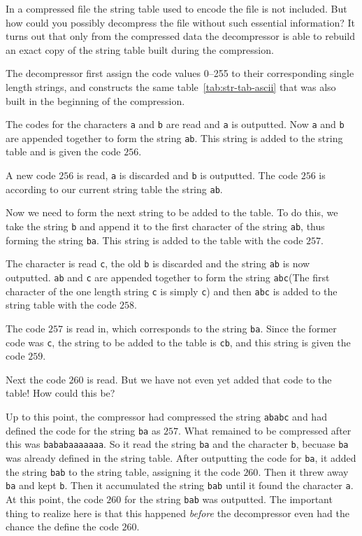 In a \lzw compressed file the string table used to encode the file is
not included. But how could you possibly decompress the file without
such essential information? It turns out that only from the compressed
data the decompressor is able to rebuild an exact copy of the string
table built during the compression.

The decompressor first assign the code values 0--255 to their
corresponding single length strings, and constructs the same
table~\ref{tab:str-tab-ascii} that was also built in the beginning of
the compression.

The codes for the characters \texttt{a} and \texttt{b} are read and
\texttt{a} is outputted. Now \texttt{a} and \texttt{b} are appended
together to form the string \texttt{ab}. This string is added to the
string table and is given the code $256$.

A new code $256$ is read, \texttt{a} is discarded and \texttt{b} is
outputted. The code $256$ is according to our current string table the
string \texttt{ab}.

Now we need to form the next string to be added to the table. To do
this, we take the string \texttt{b} and append it to the first
character of the string \texttt{ab}, thus forming the string
\texttt{ba}. This string is added to the table with the code $257$.

The character is read \texttt{c}, the old \texttt{b} is discarded and the string
\texttt{ab} is now outputted. \texttt{ab} and \texttt{c} are appended together
to form the string \texttt{abc}(The first character of the one length
string \texttt{c} is simply \texttt{c}) and then \texttt{abc} is added to the string
table with the code $258$.

The code $257$ is read in, which corresponds to the string
\texttt{ba}. Since the former code was \texttt{c}, the string to be
added to the table is \texttt{cb}, and this string is given the code
$259$.

Next the code $260$ is read. But we have not even yet added that code
to the table! How could this be?

Up to this point, the compressor had compressed the string
\texttt{ababc} and had defined the code for the string \texttt{ba} as
$257$. What remained to be compressed after this was
\texttt{bababaaaaaaa}. So it read the string \texttt{ba} and the
character \texttt{b}, becuase \texttt{ba} was already defined in the
string table. After outputting the code for \texttt{ba}, it added the
string \texttt{bab} to the string table, assigning it the code
$260$. Then it threw away \texttt{ba} and kept \texttt{b}. Then it
accumulated the string \texttt{bab} until it found the character
\texttt{a}. At this point, the code $260$ for the string \texttt{bab}
was outputted.  The important thing to realize here is that this
happened \textit{before} the decompressor even had the chance the
define the code $260$.

